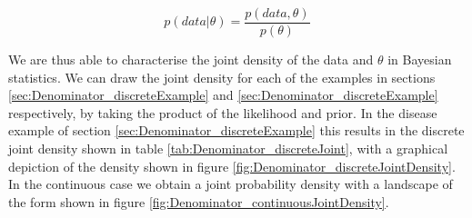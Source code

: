\documentclass[11pt,fullpage]{book}
\begin{document}
\begin{equation}
p(data|\theta) = \frac{p(data,\theta)}{p(\theta)}
\end{equation} 

We are thus able to characterise the joint density of the data and $\theta$ in Bayesian statistics. We can draw the joint density for each of the examples in sections \ref{sec:Denominator_discreteExample} and \ref{sec:Denominator_discreteExample} respectively, by taking the product of the likelihood and prior. In the disease example of section \ref{sec:Denominator_discreteExample} this results in the discrete joint density shown in table \ref{tab:Denominator_discreteJoint}, with a graphical depiction of the density shown in figure \ref{fig:Denominator_discreteJointDensity}. In the continuous case we obtain a joint probability density with a landscape of the form shown in figure \ref{fig:Denominator_continuousJointDensity}.
\end{document}
